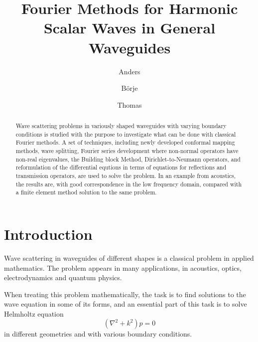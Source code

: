 \documentclass[numreferences]{kluwer}
\begin{document}
\begin{opening}
  \title{Fourier Methods for Harmonic Scalar Waves in General
    Waveguides}

  \author{Anders
    }
   \author{B\"orje
    }
   \author{Thomas
    } 
  \begin{abstract}
    Wave scattering problems in variously shaped waveguides with
    varying boundary conditions is studied with the purpose to
    investigate what can be done with classical Fourier methods. A set
    of techniques, including newly developed conformal mapping
    methods, wave splitting, Fourier series development where
    non-normal operators have non-real eigenvalues, the Building block
    Method, Dirichlet-to-Neumann operators, and reformulation of the
    differential equtions in terms of equations for reflections and
    transmission operators, are used to solve the problem. In an
    example from acoustics, the results are, with good correspondence
    in the low frequency domain, compared with a finite element method
    solution to the same problem.
  \end{abstract}
\end{opening}

\section{Introduction}
\label{sec:intro}

Wave scattering in waveguides of different shapes is a classical
problem in applied mathematics. The problem appears in many
applications, in acoustics, optics, electrodynamics and quantum
physics.

When treating this problem mathematically, the task is to find
solutions to the wave equation in some of its forms, and an essential
part of this task is to solve Helmholtz equation
\begin{equation}
  \label{eq:Helmholtz1}
  (\nabla^2+k^2)p=0
\end{equation}
in different geometries and with various boundary conditions.
\end{document}
